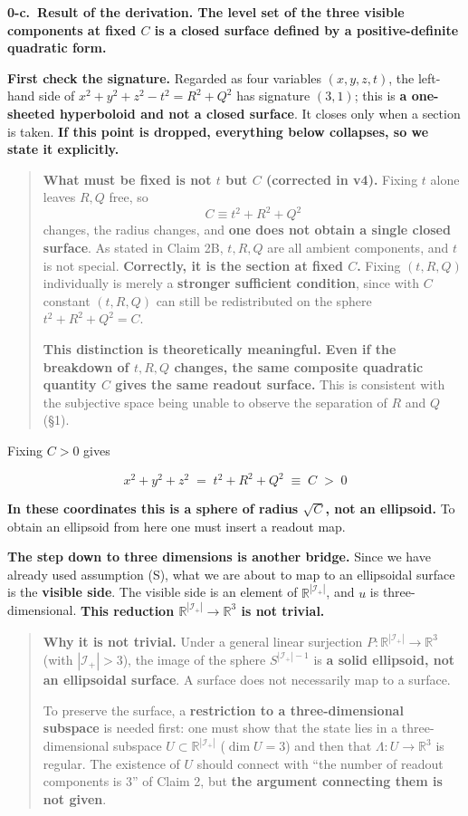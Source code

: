 \documentclass[
  10pt,
]{article}
\begin{document}
\textbf{0-c.~Result of the derivation. The level set of the three
visible components at fixed \(C\) is a closed surface defined by a
positive-definite quadratic form.}

\textbf{First check the signature.} Regarded as four variables
\((x,y,z,t)\), the left-hand side of \(x^2+y^2+z^2-t^2 = R^2+Q^2\) has
signature \((3,1)\); this is \textbf{a one-sheeted hyperboloid and not a
closed surface}. It closes only when a section is taken. \textbf{If this
point is dropped, everything below collapses, so we state it
explicitly.}

\begin{quote}
\textbf{What must be fixed is not \(t\) but \(C\) (corrected in v4).}
Fixing \(t\) alone leaves \(R, Q\) free, so \[C \equiv t^2+R^2+Q^2\]
changes, the radius changes, and \textbf{one does not obtain a single
closed surface}. As stated in Claim 2B, \(t, R, Q\) are all ambient
components, and \(t\) is not special. \textbf{Correctly, it is the
section at fixed \(C\).} Fixing \((t,R,Q)\) individually is merely a
\textbf{stronger sufficient condition}, since with \(C\) constant
\((t,R,Q)\) can still be redistributed on the sphere \(t^2+R^2+Q^2=C\).

\textbf{This distinction is theoretically meaningful.} \textbf{Even if
the breakdown of \(t, R, Q\) changes, the same composite quadratic
quantity \(C\) gives the same readout surface.} This is consistent with
the subjective space being unable to observe the separation of \(R\) and
\(Q\) (§1).
\end{quote}

Fixing \(C > 0\) gives

\[x^2 + y^2 + z^2 \;=\; t^2 + R^2 + Q^2 \;\equiv\; C \;>\; 0\]

\textbf{In these coordinates this is a sphere of radius \(\sqrt{C}\),
not an ellipsoid.} To obtain an ellipsoid from here one must insert a
readout map.

\textbf{The step down to three dimensions is another bridge.} Since we
have already used assumption (S), what we are about to map to an
ellipsoidal surface is the \textbf{visible side}. The visible side is an
element of \(\mathbb{R}^{|\mathcal{I}_+|}\), and \(u\) is
three-dimensional. \textbf{This reduction
\(\mathbb{R}^{|\mathcal{I}_+|} \to \mathbb{R}^3\) is not trivial.}

\begin{quote}
\textbf{Why it is not trivial.} Under a general linear surjection
\(P : \mathbb{R}^{|\mathcal{I}_+|} \to \mathbb{R}^3\) (with
\(|\mathcal{I}_+| > 3\)), the image of the sphere
\(S^{|\mathcal{I}_+|-1}\) is \textbf{a solid ellipsoid, not an
ellipsoidal surface}. A surface does not necessarily map to a surface.

To preserve the surface, a \textbf{restriction to a three-dimensional
subspace} is needed first: one must show that the state lies in a
three-dimensional subspace \(U \subset \mathbb{R}^{|\mathcal{I}_+|}\)
(\(\dim U = 3\)) and then that \(\Lambda : U \to \mathbb{R}^3\) is
regular. The existence of \(U\) should connect with ``the number of
readout components is 3'' of Claim 2, but \textbf{the argument
connecting them is not given}.
\end{quote}
\end{document}
